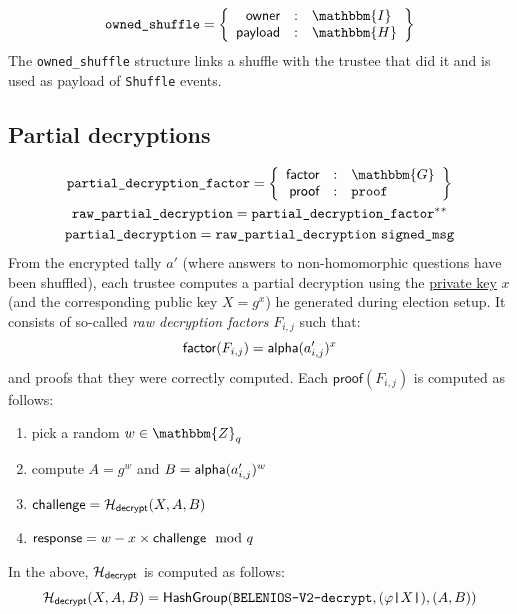 \documentclass[a4paper]{article}
\newcommand{\dstprefix}{BELENIOS-V2}
\newcommand{\G}{\mathbbm{G}}
\newcommand{\Z}{\mathbbm{Z}}
\newcommand{\hash}{\mathbbm{H}}
\newcommand{\I}{\mathbbm{I}}
\newcommand{\pdecryption}{\texttt{partial\_decryption}}
\begin{document}
\begin{gather*}
  \texttt{owned\_shuffle}=\left\{
    \begin{array}{rcl}
      \textsf{owner}&:&\I\\
      \textsf{payload}&:&\hash
    \end{array}
  \right\}
\end{gather*}
The \texttt{owned\_shuffle} structure links a shuffle with the trustee
that did it and is used as payload of \texttt{Shuffle} events.

\subsection{Partial decryptions}
\label{partial-decryptions}

\newcommand{\dfactors}{\textsf{decryption\_factors}}
\newcommand{\dproofs}{\textsf{decryption\_proofs}}
\newcommand{\decrypt}{\textsf{decrypt}}

\begin{gather*}
  \texttt{partial\_decryption\_factor}=\left\{
    \begin{array}{rcl}
      \textsf{factor}&:&\G\\
      \textsf{proof}&:&\proof
    \end{array}
  \right\}\\
  \texttt{raw\_partial\_decryption}=\texttt{partial\_decryption\_factor}^\ast{}^\ast\\
  \pdecryption=\texttt{raw\_partial\_decryption}\ \texttt{signed\_msg}
\end{gather*}
From the encrypted tally $a'$ (where answers to non-homomorphic questions
have been shuffled), each trustee computes a partial decryption using
the \hyperref[trustee-keys]{private key} $x$ (and the corresponding
public key $X=g^x$) he generated during election setup. It consists of
so-called \emph{raw decryption factors} $F_{i,j}$ such that:
\[
\textsf{factor}(F_{i,j})=\textsf{alpha}(a'_{i,j})^x
\]
and proofs that they were correctly computed. Each
$\textsf{proof}(F_{i,j})$ is computed as follows:
\begin{enumerate}
\item pick a random $w\in\Z_q$
\item compute $A=g^w$ and $B=\textsf{alpha}(a'_{i,j})^w$
\item $\challenge=\Hash_\decrypt(X,A,B)$
\item $\textsf{response}=w-x\times\textsf{challenge}\mod q$
\end{enumerate}
In the above, $\Hash_\decrypt$ is computed as follows:
\[
\Hash_\decrypt(X,A,B)=\textsf{HashGroup}(\texttt{\dstprefix-decrypt},(\varphi\verb=|=X\verb=|=),(A,B))
\]
\end{document}
